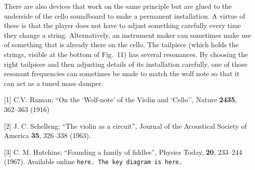 
  There are also devices that work on the same principle but are glued to the 
  underside of the cello soundboard to make a permanent installation. A virtue 
  of these is that the player does not have to adjust something carefully every 
  time they change a string. Alternatively, an instrument maker can sometimes 
  make use of something that is already there on the cello. The tailpiece 
  (which holds the strings, visible at the bottom of Fig.\ 11) has several 
  resonances. By choosing the right tailpiece and then adjusting details of its 
  installation carefully, one of those resonant frequencies can sometimes be 
  made to match the wolf note so that it can act as a tuned mass damper. 



  \sectionreferences{}[1] C.V. Raman; ``On the `Wolf-note' of the Violin and 
  `Cello'', Nature \textbf{2435}, 362--363 (1916) 

  [2] J. C. Schelleng; ``The violin as a circuit'', Journal of the Acoustical 
  Society of America \textbf{35}, 326--338 (1963). 

  [3] C. M. Hutchins; ``Founding a family of fiddles'', Physics Today, 
  \textbf{20}, 233--244 (1967). Available online \tt{}here\rm{}. The key 
  diagram is \tt{}here\rm{}. 